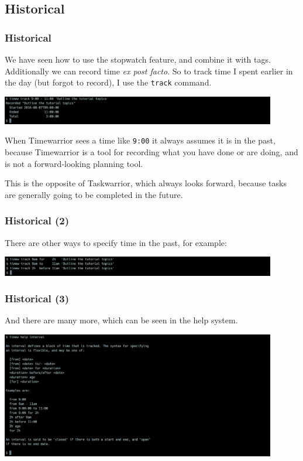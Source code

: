 \documentclass[t,handout]{beamer}
\begin{document}
\subsection{Historical}

\begin{frame}[fragile]\frametitle{Historical}
    \vfill
    We have seen how to use the stopwatch feature, and combine it with tags. Additionally we can record time \textit{ex post facto}. So to track time I spent earlier in the day (but forgot to record), I use the \verb=track= command.

    \includegraphics[width=12cm]{images/tutorial15.png}

    When Timewarrior sees a time like \verb=9:00= it always assumes it is in the past, because Timewarrior is a tool for recording what you have done or are doing, and is not a forward-looking planning tool.

    This is the opposite of Taskwarrior, which always looks forward, because tasks are generally going to be completed in the future.
\end{frame}

\begin{frame}[fragile]\frametitle{Historical (2)}
    \vfill
    There are other ways to specify time in the past, for example:

    \includegraphics[width=12cm]{images/tutorial16.png}
\end{frame}

\begin{frame}[fragile]\frametitle{Historical (3)}
    \vfill
    And there are many more, which can be seen in the help system.

    \includegraphics[width=12cm]{images/tutorial17.png}
\end{frame}
\end{document}
